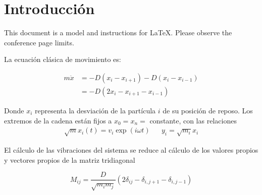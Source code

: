 \section{Introducción}
This document is a model and instructions for \LaTeX.
Please observe the conference page limits. 

La ecuación clásica de movimiento es:

\begin{align*}
	m \ddot x & = -D(x_i - x_{i+1}) - D(x_i - x_{i-1}) \\
	          & = -D(2x_i - x_{i+1} - x_{i-1})         
\end{align*}

Donde $x_i$ representa la desviación de la partícula $i$ de su posición de reposo. Los extremos de la cadena están fijos a $x_0 = x_n = $ constante, con las relaciones
\begin{align*}
	\sqrt{m} x_i(t) = v_i \exp(i \omega t) &   & y_i = \sqrt{m_i}x_i 
\end{align*}

El cálculo de las vibraciones del sistema se reduce al cálculo de los valores propios y vectores propios de la matriz tridiagonal

\begin{equation*}
	M_{ij} = \frac{D}{\sqrt{m_i m_j}} (2 \delta_{ij} - \delta_{i, j+1} - \delta_{i, j-1}) 
\end{equation*}



